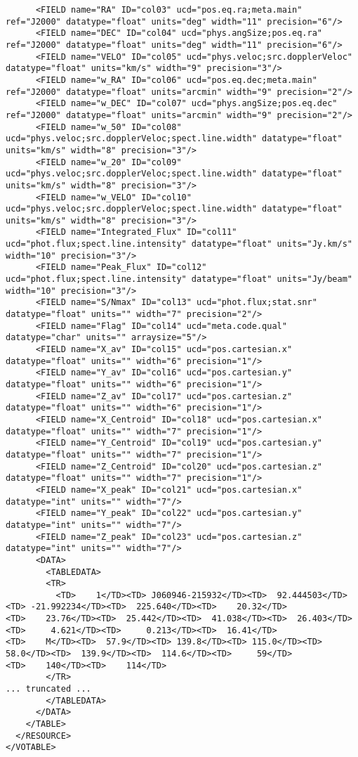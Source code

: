 {\begin{verbatim}
      <FIELD name="RA" ID="col03" ucd="pos.eq.ra;meta.main" ref="J2000" datatype="float" units="deg" width="11" precision="6"/>
      <FIELD name="DEC" ID="col04" ucd="phys.angSize;pos.eq.ra" ref="J2000" datatype="float" units="deg" width="11" precision="6"/>
      <FIELD name="VELO" ID="col05" ucd="phys.veloc;src.dopplerVeloc" datatype="float" units="km/s" width="9" precision="3"/>
      <FIELD name="w_RA" ID="col06" ucd="pos.eq.dec;meta.main" ref="J2000" datatype="float" units="arcmin" width="9" precision="2"/>
      <FIELD name="w_DEC" ID="col07" ucd="phys.angSize;pos.eq.dec" ref="J2000" datatype="float" units="arcmin" width="9" precision="2"/>
      <FIELD name="w_50" ID="col08" ucd="phys.veloc;src.dopplerVeloc;spect.line.width" datatype="float" units="km/s" width="8" precision="3"/>
      <FIELD name="w_20" ID="col09" ucd="phys.veloc;src.dopplerVeloc;spect.line.width" datatype="float" units="km/s" width="8" precision="3"/>
      <FIELD name="w_VELO" ID="col10" ucd="phys.veloc;src.dopplerVeloc;spect.line.width" datatype="float" units="km/s" width="8" precision="3"/>
      <FIELD name="Integrated_Flux" ID="col11" ucd="phot.flux;spect.line.intensity" datatype="float" units="Jy.km/s" width="10" precision="3"/>
      <FIELD name="Peak_Flux" ID="col12" ucd="phot.flux;spect.line.intensity" datatype="float" units="Jy/beam" width="10" precision="3"/>
      <FIELD name="S/Nmax" ID="col13" ucd="phot.flux;stat.snr" datatype="float" units="" width="7" precision="2"/>
      <FIELD name="Flag" ID="col14" ucd="meta.code.qual" datatype="char" units="" arraysize="5"/>
      <FIELD name="X_av" ID="col15" ucd="pos.cartesian.x" datatype="float" units="" width="6" precision="1"/>
      <FIELD name="Y_av" ID="col16" ucd="pos.cartesian.y" datatype="float" units="" width="6" precision="1"/>
      <FIELD name="Z_av" ID="col17" ucd="pos.cartesian.z" datatype="float" units="" width="6" precision="1"/>
      <FIELD name="X_Centroid" ID="col18" ucd="pos.cartesian.x" datatype="float" units="" width="7" precision="1"/>
      <FIELD name="Y_Centroid" ID="col19" ucd="pos.cartesian.y" datatype="float" units="" width="7" precision="1"/>
      <FIELD name="Z_Centroid" ID="col20" ucd="pos.cartesian.z" datatype="float" units="" width="7" precision="1"/>
      <FIELD name="X_peak" ID="col21" ucd="pos.cartesian.x" datatype="int" units="" width="7"/>
      <FIELD name="Y_peak" ID="col22" ucd="pos.cartesian.y" datatype="int" units="" width="7"/>
      <FIELD name="Z_peak" ID="col23" ucd="pos.cartesian.z" datatype="int" units="" width="7"/>
      <DATA>
        <TABLEDATA>
        <TR>
          <TD>    1</TD><TD> J060946-215932</TD><TD>  92.444503</TD><TD> -21.992234</TD><TD>  225.640</TD><TD>    20.32</TD>
<TD>    23.76</TD><TD>  25.442</TD><TD>  41.038</TD><TD>  26.403</TD><TD>     4.621</TD><TD>     0.213</TD><TD>  16.41</TD>
<TD>    M</TD><TD>  57.9</TD><TD> 139.8</TD><TD> 115.0</TD><TD>   58.0</TD><TD>  139.9</TD><TD>  114.6</TD><TD>     59</TD>
<TD>    140</TD><TD>    114</TD>
        </TR>
... truncated ...
        </TABLEDATA>
      </DATA>
    </TABLE>
  </RESOURCE>
</VOTABLE>
  \end{verbatim}
}
